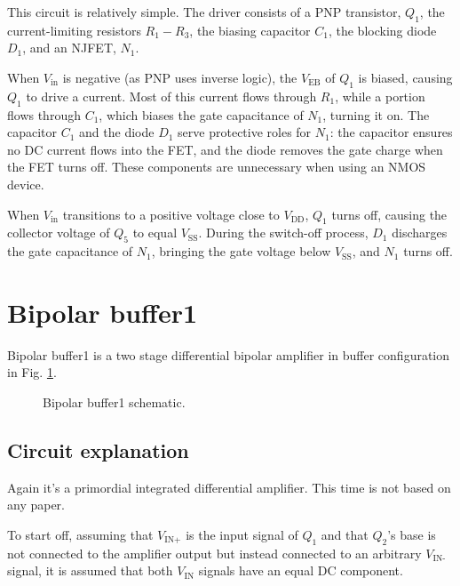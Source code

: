 \documentclass[12pt]{article}
\begin{document}
This circuit is relatively simple. The driver consists of a PNP transistor, $Q_1$, the current-limiting resistors $R_1 - R_3$, the biasing capacitor $C_1$, the blocking diode $D_1$, and an NJFET, $N_1$.  

When $V_{\text{in}}$ is negative (as PNP uses inverse logic), the $V_{\text{EB}}$ of $Q_1$ is biased, causing $Q_1$ to drive a current. Most of this current flows through $R_1$, while a portion flows through $C_1$, which biases the gate capacitance of $N_1$, turning it on. The capacitor $C_1$ and the diode $D_1$ serve protective roles for $N_1$: the capacitor ensures no DC current flows into the FET, and the diode removes the gate charge when the FET turns off. These components are unnecessary when using an NMOS device.  

When $V_{\text{in}}$ transitions to a positive voltage close to $V_{\text{DD}}$, $Q_1$ turns off, causing the collector voltage of $Q_5$ to equal $V_{\text{SS}}$. During the switch-off process, $D_1$ discharges the gate capacitance of $N_1$, bringing the gate voltage below $V_{\text{SS}}$, and $N_1$ turns off.  


\newpage
\section{Bipolar buffer1}



Bipolar buffer1 is a two stage differential bipolar amplifier in buffer configuration in Fig. \ref{bipolarbuffer01}. 

\begin{figure}[H]
        \centering
        
        \caption{Bipolar buffer1  schematic.}
        \label{bipolarbuffer01}
\end{figure}

\subsection{Circuit explanation}


Again it's a primordial integrated differential amplifier. This time is not based on any paper.

To start off, assuming that $V_{\text{IN+}}$ is the input signal of $Q_1$ and that $Q_2$'s base is not connected to the amplifier output but instead connected to an arbitrary $V_{\text{IN-}}$ signal, it is assumed that both $V_{\text{IN}}$ signals have an equal DC component.
\end{document}
